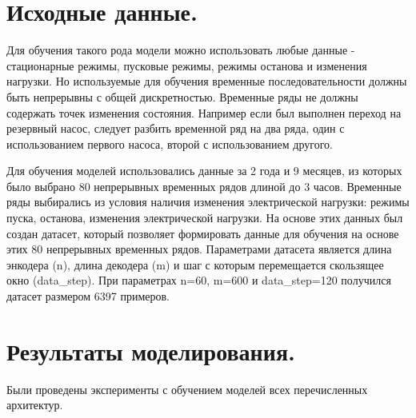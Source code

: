 \documentclass[12pt,a4paper]{article}
\begin{document}

\section{Исходные данные.}
Для обучения такого рода модели можно использовать любые данные - стационарные режимы, пусковые режимы, режимы останова и изменения нагрузки. Но используемые для обучения временные последовательности должны быть непрерывны с общей дискретностью. Временные ряды не должны содержать точек изменения состояния. Например если был выполнен переход на резервный насос, следует разбить временной ряд на два ряда, один с использованием первого насоса, второй с использованием другого.

Для обучения моделей использовались данные за 2 года и 9 месяцев, из которых было выбрано 80 непрерывных временных рядов длиной до 3 часов. Временные ряды выбирались из условия наличия изменения электрической нагрузки: режимы пуска, останова, изменения электрической нагрузки. На основе этих данных был создан датасет, который позволяет формировать данные для обучения на основе этих 80 непрерывных временных рядов. Параметрами датасета является длина энкодера (n), длина декодера (m) и шаг с которым перемещается скользящее окно (data\_step). При параметрах n=60, m=600 и data\_step=120 получился датасет размером 6397 примеров. 


\section{Результаты моделирования.}

Были проведены эксперименты с обучением моделей всех перечисленных архитектур.
\end{document}
